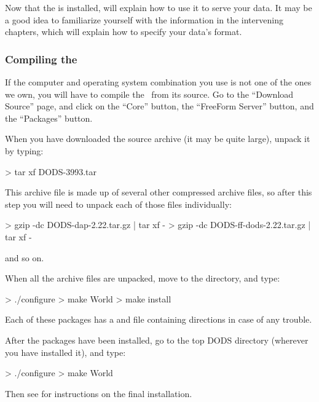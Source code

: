Now that the \ffs is installed,  will explain
how to use it to serve your data.  It may be a good idea to
familiarize yourself with the information in the intervening chapters,
which will explain how to specify your data's format.

\subsubsection{Compiling the \ffs}

If the computer and operating system combination you use is not one of
the ones we own, you will have to compile the \ffs\ from its source.
Go to the ``Download Source'' page, and click on the ``Core'' button,
the ``FreeForm Server'' button, and the ``Packages'' button.

When you have downloaded the source archive (it may be quite large),
unpack it by typing:

\begin{example}
> tar xf DODS-3993.tar
\end{example}

This archive file is made up of several other compressed archive
files, so after this step you will need to unpack each of those files
individually: 

\begin{example}
> gzip -dc DODS-dap-2.22.tar.gz | tar xf -
> gzip -dc DODS-ff-dods-2.22.tar.gz | tar xf -
\end{example}

and so on.

When all the archive files are unpacked, move to the
 directory, and type:

\begin{example}
> ./configure
> make World
> make install
\end{example}

Each of these packages has a  and  file
containing directions in case of any trouble.

After the packages have been installed, go to the top DODS directory
(wherever you have installed it), and type:

\begin{example}
> ./configure
> make World
\end{example}

Then see  for instructions on the final
installation. 





